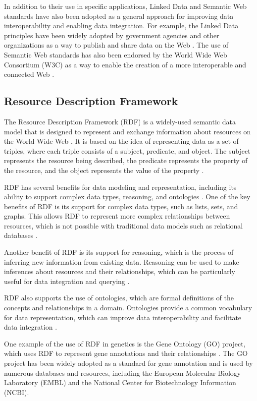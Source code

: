 In addition to their use in specific applications, Linked Data and Semantic Web standards have also been adopted as a general approach for improving data interoperability and enabling data integration.  For example, the Linked Data principles have been widely adopted by government agencies and other organizations as a way to publish and share data on the Web \citep{bizer2011linkedData}.  The use of Semantic Web standards has also been endorsed by the World Wide Web Consortium (W3C) as a way to enable the creation of a more interoperable and connected Web \citep{shadbolt2006semantic}.

\subsection{Resource Description Framework}
The Resource Description Framework (RDF) is a widely-used semantic data model that is designed to represent and exchange information about resources on the World Wide Web \citep{schreiber2014rdf}.  It is based on the idea of representing data as a set of triples, where each triple consists of a subject, predicate, and object.  The subject represents the resource being described, the predicate represents the property of the resource, and the object represents the value of the property \citep{schreiber2014rdf}.

RDF has several benefits for data modeling and representation, including its ability to support complex data types, reasoning, and ontologies \citep{schreiber2014rdf}.  One of the key benefits of RDF is its support for complex data types, such as lists, sets, and graphs.  This allows RDF to represent more complex relationships between resources, which is not possible with traditional data models such as relational databases \citep{allemang2011semantic}.

Another benefit of RDF is its support for reasoning, which is the process of inferring new information from existing data.  Reasoning can be used to make inferences about resources and their relationships, which can be particularly useful for data integration and querying \citep{allemang2011semantic}.

RDF also supports the use of ontologies, which are formal definitions of the concepts and relationships in a domain.  Ontologies provide a common vocabulary for data representation, which can improve data interoperability and facilitate data integration \citep{heath2011linked}.

One example of the use of RDF in genetics is the Gene Ontology (GO) project, which uses RDF to represent gene annotations and their relationships \citep{gene2004gene}.  The GO project has been widely adopted as a standard for gene annotation and is used by numerous databases and resources, including the European Molecular Biology Laboratory (EMBL) and the National Center for Biotechnology Information (NCBI).

